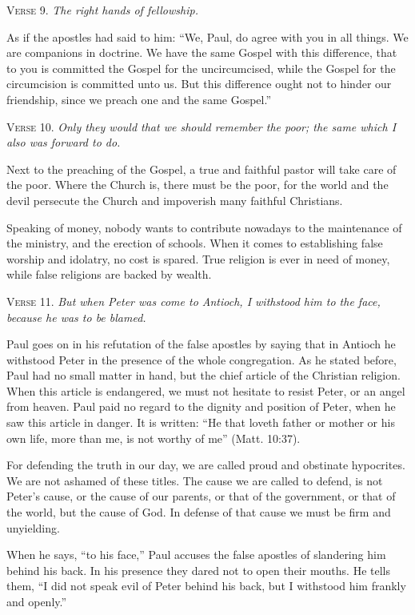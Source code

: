 \textsc{Verse} 9. \emph{The right hands of fellowship.}

As if the apostles had said to him: “We, Paul, do agree with you in all things. We are companions in doctrine. We have the same Gospel with this difference, that to you is committed the Gospel for the uncircumcised, while the Gospel for the circumcision is committed unto us. But this difference ought not to hinder our friendship, since we preach one and the same Gospel.”

\textsc{Verse} 10. \emph{Only they would that we should remember the poor; the same which I also was forward to do.}

Next to the preaching of the Gospel, a true and faithful pastor will take care of the poor. Where the Church is, there must be the poor, for the world and the devil persecute the Church and impoverish many faithful Christians.

Speaking of money, nobody wants to contribute nowadays to the maintenance of the ministry, and the erection of schools. When it comes to establishing false worship and idolatry, no cost is spared. True religion is ever in need of money, while false religions are backed by wealth.

\textsc{Verse} 11. \emph{But when Peter was come to Antioch, I withstood him to the face, because he was to be blamed.}

Paul goes on in his refutation of the false apostles by saying that in Antioch he withstood Peter in the presence of the whole congregation. As he stated before, Paul had no small matter in hand, but the chief article of the Christian religion. When this article is endangered, we must not hesitate to resist Peter, or an angel from heaven. Paul paid no regard to the dignity and position of Peter, when he saw this article in danger. It is written: “He that loveth father or mother or his own life, more than me, is not worthy of me” (Matt. 10:37).

For defending the truth in our day, we are called proud and obstinate hypocrites. We are not ashamed of these titles. The cause we are called to defend, is not Peter’s cause, or the cause of our parents, or that of the government, or that of the world, but the cause of God. In defense of that cause we must be firm and unyielding.

When he says, “to his face,” Paul accuses the false apostles of slandering him behind his back. In his presence they dared not to open their mouths. He tells them, “I did not speak evil of Peter behind his back, but I withstood him frankly and openly.”

